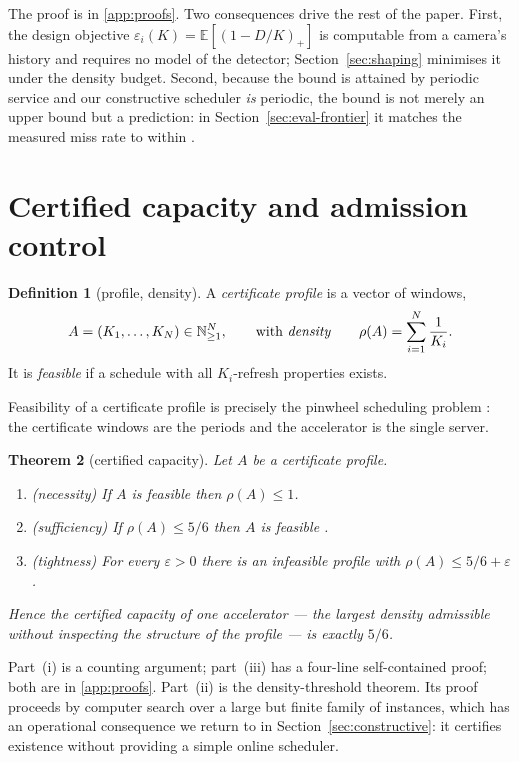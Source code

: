 \documentclass[preprint,review,12pt]{elsarticle}
\newtheorem{theorem}{Theorem}
\theoremstyle{definition}
\newtheorem{definition}[theorem]{Definition}
\newcommand{\Nc}{N}
\newcommand{\Ki}{K_i}
\newcommand{\dens}{\rho}
\newcommand{\Dur}{D}
\newcommand{\pos}[1]{(#1)_{+}}
\begin{document}
The proof is in \ref{app:proofs}. Two consequences drive the rest of the paper. First, the design
objective $\varepsilon_i(K)=\mathbb{E}[\pos{1-\Dur/K}]$ is computable from a camera's history and
requires no model of the detector; Section~\ref{sec:shaping} minimises it under the density
budget. Second, because the bound is attained by periodic service and our constructive scheduler
\emph{is} periodic, the bound is not merely an upper bound but a prediction: in
Section~\ref{sec:eval-frontier} it matches the measured miss rate to within \numEtwoBoundErr.

\section{Certified capacity and admission control}\label{sec:capacity}

\begin{definition}[profile, density]\label{def:profile}
A \emph{certificate profile} is a vector of windows,
\[
A=(K_1,\dots,K_\Nc)\in\mathbb{N}_{\ge1}^{\Nc},
\qquad\text{with \emph{density}}\qquad
\dens(A)=\sum_{i=1}^{\Nc}\frac{1}{\Ki}.
\]
It is \emph{feasible} if a schedule with all $\Ki$-refresh properties exists.
\end{definition}

Feasibility of a certificate profile is precisely the pinwheel scheduling problem
\cite{holte1989pinwheel}: the certificate windows are the periods and the accelerator is the
single server.

\begin{theorem}[certified capacity]\label{thm:capacity}
Let $A$ be a certificate profile.
\begin{enumerate}
\item[(i)] (necessity) If $A$ is feasible then $\dens(A)\le1$.
\item[(ii)] (sufficiency) If $\dens(A)\le 5/6$ then $A$ is feasible \cite{kawamura2024stoc,kawamura2026pnas}.
\item[(iii)] (tightness) For every $\varepsilon>0$ there is an infeasible profile with
      $\dens(A)\le 5/6+\varepsilon$.
\end{enumerate}
Hence the \emph{certified capacity} of one accelerator --- the largest density admissible without
inspecting the structure of the profile --- is exactly $5/6$.
\end{theorem}

Part~(i) is a counting argument; part~(iii) has a four-line self-contained proof; both are in
\ref{app:proofs}. Part~(ii) is the density-threshold theorem. Its proof proceeds by computer
search over a large but finite family of instances, which has an operational consequence we return
to in Section~\ref{sec:constructive}: it certifies existence without providing a simple online
scheduler.
\end{document}
